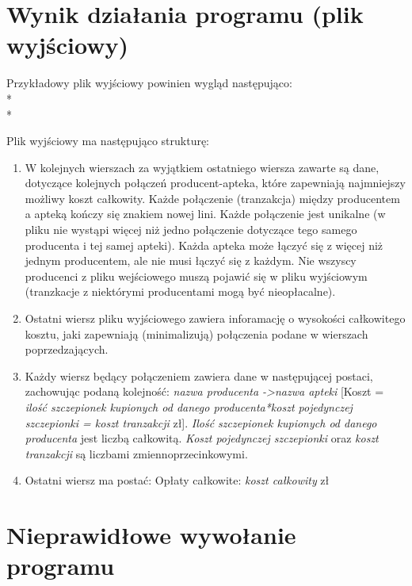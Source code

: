 \documentclass[11pt]{article}
\begin{document}
\section{Wynik działania programu (plik wyjściowy)}
Przykładowy plik wyjściowy powinien wygląd następująco:\\*\\*

\vspace{1em}
Plik wyjściowy ma następująco strukturę:
\begin{enumerate}
    \item W kolejnych wierszach za wyjątkiem ostatniego wiersza zawarte są dane, dotyczące kolejnych połączeń producent-apteka, które zapewniają najmniejszy możliwy koszt całkowity. Każde połączenie (tranzakcja) między producentem a apteką kończy się znakiem nowej lini. Każde połączenie jest unikalne (w pliku nie wystąpi więcej niż jedno połączenie dotyczące tego samego producenta i tej samej apteki). Każda apteka może łączyć się z więcej niż jednym producentem, ale nie musi łączyć się z każdym. Nie wszyscy producenci z pliku wejściowego muszą pojawić się w pliku wyjściowym (tranzkacje z niektórymi producentami mogą być nieopłacalne).
    \item Ostatni wiersz pliku wyjściowego zawiera inforamację o wysokości całkowitego kosztu, jaki zapewniają (minimalizują) połączenia podane w wierszach poprzedzających. 
    \item Każdy wiersz będący połączeniem zawiera dane w następującej postaci, zachowując podaną kolejność: \emph{nazwa producenta -\textgreater\space nazwa apteki} [Koszt = \emph{ilość szczepionek kupionych od danego producenta*koszt pojedynczej szczepionki = koszt tranzakcji} zł]. \emph{Ilość szczepionek kupionych od danego producenta} jest liczbą całkowitą. \emph{Koszt pojedynczej szczepionki} oraz \emph{koszt tranzakcji} są liczbami zmiennoprzecinkowymi.
    \item Ostatni wiersz ma postać: Opłaty całkowite: \emph{koszt całkowity} zł
\end{enumerate}
\section{Nieprawidłowe wywołanie programu}
\end{document}

